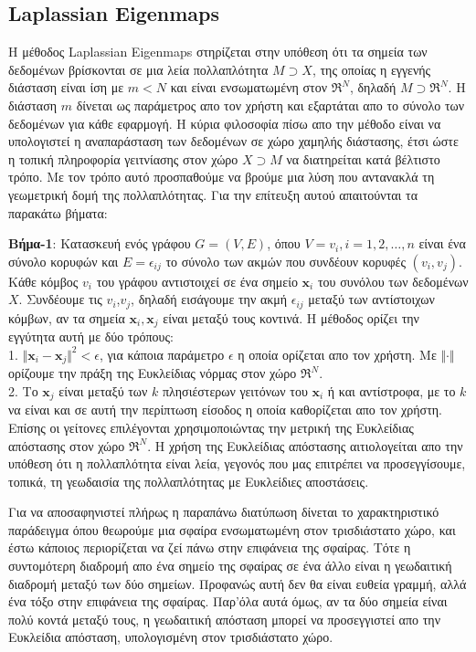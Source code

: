 \subsection{\textlatin{Laplassian Eigenmaps}}
\par
Η μέθοδος \textlatin{Laplassian Eigenmaps}\textlatin{\cite{laplassianeigenmaps}} στηρίζεται στην υπόθεση ότι τα σημεία των δεδομένων βρίσκονται σε μια λεία πολλαπλότητα $ Μ \supset Χ $, της οποίας η εγγενής διάσταση είναι ίση με $m<N$ και είναι ενσωματωμένη στον $ \Re^{N} $, δηλαδή $ Μ \supset \Re^{N} $. Η διάσταση $m$ δίνεται ως παράμετρος απο τον χρήστη και εξαρτάται απο το σύνολο των δεδομένων για κάθε εφαρμογή. Η κύρια φιλοσοφία πίσω απο την μέθοδο είναι να υπολογιστεί η αναπαράσταση των δεδομένων σε χώρο χαμηλής διάστασης, έτσι ώστε η τοπική πληροφορία γειτνίασης στον χώρο $Χ \supset M$ να διατηρείται κατά βέλτιστο τρόπο. Με τον τρόπο αυτό προσπαθούμε να βρούμε μια λύση που αντανακλά τη γεωμετρική δομή της πολλαπλότητας. Για την επίτευξη αυτού απαιτούνται τα παρακάτω βήματα:
\par
\textbf{Βήμα-1}: Κατασκευή ενός γράφου $G=(V,E)$, όπου $V={v_{i},i=1,2,\ldots,n}$ είναι ένα σύνολο κορυφών και $E={\epsilon_{ij}}$ το σύνολο των ακμών που συνδέουν κορυφές $(v_{i},v_{j})$. Κάθε κόμβος $v_{i}$ του γράφου αντιστοιχεί σε ένα σημείο $\mathbf{x}_{i}$ του συνόλου των δεδομένων $X$. Συνδέουμε τις $v_{i}$,$v_{j}$, δηλαδή εισάγουμε την ακμή $\epsilon_{ij}$ μεταξύ των αντίστοιχων κόμβων, αν τα σημεία $\mathbf{x}_{i},\mathbf{x}_{j}$ είναι μεταξύ τους κοντινά. Η μέθοδος ορίζει την εγγύτητα αυτή με δύο τρόπους: \\
1. $\Vert \mathbf{x}_{i}-\mathbf{x}_{j} \Vert ^{2} < \epsilon $, για κάποια παράμετρο $\epsilon$ η οποία ορίζεται απο τον χρήστη. Με $\Vert\cdot\Vert$ ορίζουμε την πράξη της Ευκλείδιας νόρμας στον χώρο $\Re^{N}$. \\
2. Το $\mathbf{x}_{j}$ είναι μεταξύ των $k$ πλησιέστερων γειτόνων του $\mathbf{x}_{i}$ ή και αντίστροφα, με το $k$ να είναι και σε αυτή την περίπτωση είσοδος η οποία καθορίζεται απο τον χρήστη. Επίσης οι γείτονες επιλέγονται χρησιμοποιώντας την μετρική της Ευκλείδιας απόστασης στον χώρο $\Re^{N}$. Η χρήση της Ευκλείδιας απόστασης αιτιολογείται απο την υπόθεση ότι η πολλαπλότητα είναι λεία, γεγονός που μας επιτρέπει να προσεγγίσουμε, τοπικά, τη γεωδαισία της πολλαπλότητας με Ευκλείδιες αποστάσεις.
\par
Για να αποσαφηνιστεί πλήρως η παραπάνω διατύπωση δίνεται το χαρακτηριστικό παράδειγμα όπου θεωρούμε μια σφαίρα ενσωματωμένη στον τρισδιάστατο χώρο, και έστω κάποιος περιορίζεται να ζεί πάνω στην επιφάνεια της σφαίρας. Τότε η συντομότερη διαδρομή απο ένα σημείο της σφαίρας σε ένα άλλο είναι η γεωδαιτική διαδρομή μεταξύ των δύο σημείων. Προφανώς αυτή δεν θα είναι ευθεία γραμμή, αλλά ένα τόξο στην επιφάνεια της σφαίρας. Παρ'όλα αυτά όμως, αν τα δύο σημεία είναι πολύ κοντά μεταξύ τους, η γεωδαιτική απόσταση μπορεί να προσεγγιστεί απο την Ευκλείδια απόσταση, υπολογισμένη στον τρισδιάστατο χώρο.
